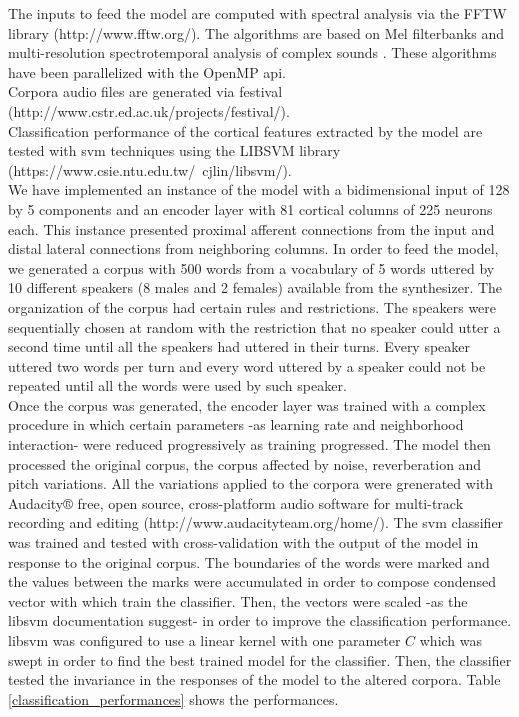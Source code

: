 \documentclass[11pt,a4paper]{article}
\begin{document}
The inputs to feed the model are computed
with spectral analysis via the FFTW library (http://www.fftw.org/).
The algorithms are based on 
Mel filterbanks and multi-resolution
spectrotemporal analysis of complex sounds \cite{taishih_2005}.
These algorithms have been parallelized with the OpenMP \gls{api}. \\

Corpora audio files are generated via \gls{festival} \\ (http://www.cstr.ed.ac.uk/projects/festival/). \\

Classification performance of the cortical features extracted by the model are tested with
\gls{svm} techniques using the LIBSVM library (https://www.csie.ntu.edu.tw/~cjlin/libsvm/). \\

We have implemented an instance of the model with a bidimensional input
of 128 by 5 components and an encoder layer
with 81 cortical columns of 225 neurons each.
This instance presented proximal afferent connections
from the input and distal lateral connections from
neighboring columns.
In order to feed the model, we generated a corpus with 500 words from a vocabulary of
5 words uttered by 10 different speakers (8 males and 2 females) available from the synthesizer.
The organization of the corpus had certain rules and restrictions.
The speakers were sequentially chosen at random with the restriction that no speaker could
utter a second time until all the speakers had uttered in their turns.
Every speaker uttered two words per turn and every word uttered by a speaker
could not be repeated until all the words were used by such speaker. \\

Once the corpus was generated, the encoder layer was trained with a complex procedure
in which certain parameters -as learning rate and neighborhood interaction- were
reduced progressively as training progressed. 
The model then processed the original corpus, the corpus affected by noise,
reverberation and pitch variations.
All the variations applied to the corpora were grenerated with
Audacity® free, open source, cross-platform audio software for
multi-track recording and editing
(http://www.audacityteam.org/home/).
The \gls{svm} classifier was trained and tested with cross-validation
with the output of the model in response to the original corpus.
The boundaries of the words were marked and the values between the marks
were accumulated in order to compose condensed vector with which train
the classifier. Then, the vectors were scaled -as the \gls{libsvm} documentation suggest-
in order to improve the classification performance.
\gls{libsvm} was configured to use a linear kernel with one parameter $C$ which
was swept in order to find the best trained model for the classifier.
Then, the classifier tested the invariance in the responses of the model
to the altered corpora.
Table \ref{classification_performances} shows the performances. \\
\end{document}
